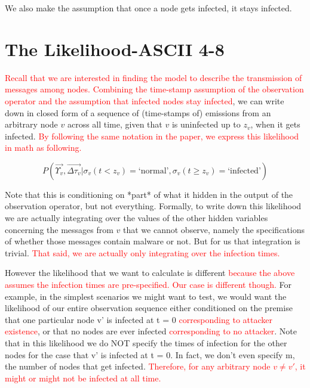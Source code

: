 \documentclass{article}
\begin{document}
	We also make the assumption that once a node gets infected, it
	stays infected.

\section{The Likelihood-ASCII 4-8}
	\textcolor{red}{Recall that we are interested in finding the model to describe
	the transmission of messages among nodes.
	Combining the time-stamp assumption of the observation operator and the assumption
	that infected nodes stay infected}, we can write down in closed form of a sequence of
	(time-stamps of) emissions from an arbitrary node $v$ across all time, given that 
	$v$ is uninfected up to $z_{v}$, when it gets infected. \textcolor{red}{By following
	the same notation in the paper, we express this likelihood in math as
	following.}

	\begin{equation*}
		P(\vec{\Upsilon_{v}}, \vec{\Delta\tau_{v}} | \sigma_{v}(t < z_{v}) = 
		\text{`normal'}, \sigma_{v}(t \geq z_{v}) = \text{`infected'})
	\end{equation*}

	Note that this is conditioning on *part* of what it hidden in the
	output of the observation operator, but not everything.  Formally, to
	write down this likelihood we are actually integrating over the values
	of the other hidden variables concerning the messages from $v$ that we
	cannot observe, namely the specifications of whether those messages
	contain malware or not. But for us that integration is trivial. 
	\textcolor{red}{That said, we are actually only integrating over the infection
	times.}

	However the likelihood that we want to calculate is different 
	\textcolor{red}{because the above assumes the infection times are pre-specified. Our
	case is different though.} For example, in the simplest scenarios we might want
	to test, we would want the likelihood of our entire observation
	sequence either conditioned on the premise that one particular node
	v' is infected at t = 0 \textcolor{red}{corresponding to attacker existence}, or that
	no nodes are ever infected \textcolor{red}{corresponding to no attacker}. Note
	that in this likelihood we do NOT specify the times of infection for
	the other nodes for the case that v' is infected at t = 0. In fact,
	we don't even specify m, the number of nodes that get infected. 
	\textcolor{red}{Therefore, for any arbitrary node $v \neq v'$, it might or might
	not be infected at all time.}
\end{document}
